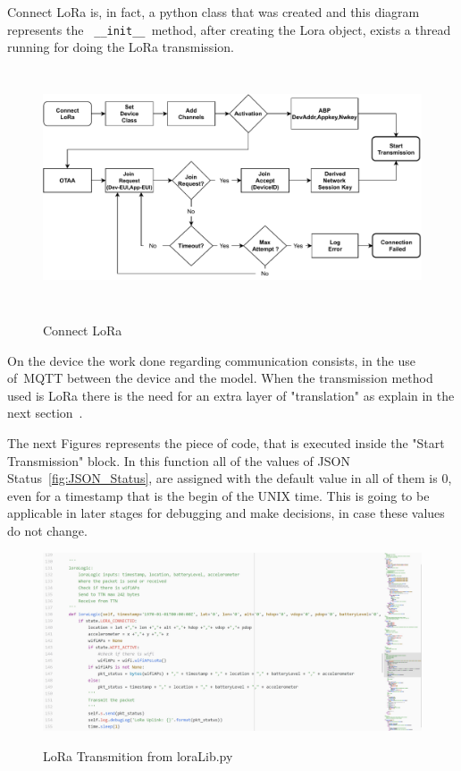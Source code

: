 Connect LoRa is, in fact, a python class that was created and this diagram represents the \verb| __init__ |method, after creating the Lora object, exists a thread running for doing the LoRa transmission.\newline
\begin{figure}[htbp]
  \centering
  
    {\includegraphics[height=7cm,width=\linewidth]{Chapters/Figures/ConnectLoRa.pdf}}%
 
  \caption{Connect LoRa}
  \label{fig:ConnectLoRa}
\end{figure}

On the device the work done regarding communication consists, in the use of~\gls{MQTT} between the device and the model. When the transmission method used is LoRa there is the need for an extra layer of "translation" as explain in the next section~.

\newpage
The next Figures represents the piece of code, that is executed inside the "Start Transmission"  block. In this function all of the values of JSON Status~\ref{fig:JSON_Status}, are assigned with the default value in all of them is 0, even for a timestamp that is the begin of the UNIX time. This is going to be applicable in later stages for debugging and make decisions, in case these values do not change.
\begin{figure}[htbp]
  \centering
  
    {\includegraphics[width=\linewidth]{Chapters/Figures/loralibwhite.JPG}}%
 
  \caption{LoRa Transmition from loraLib.py~\cite{githubcode}}
  \label{fig:LoRa_Transmit}
\end{figure}

